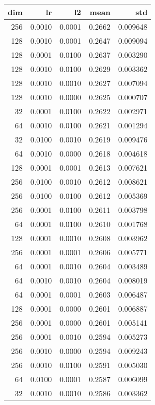 \begin{tabular}{rrrrr}
\toprule
 dim &      lr &      l2 &    mean &       std \\
\midrule
 256 &  0.0010 &  0.0001 &  0.2662 &  0.009648 \\
 128 &  0.0010 &  0.0001 &  0.2647 &  0.009094 \\
 128 &  0.0001 &  0.0100 &  0.2637 &  0.003290 \\
 128 &  0.0010 &  0.0100 &  0.2629 &  0.003362 \\
 128 &  0.0010 &  0.0010 &  0.2627 &  0.007094 \\
 128 &  0.0010 &  0.0000 &  0.2625 &  0.000707 \\
  32 &  0.0001 &  0.0100 &  0.2622 &  0.002971 \\
  64 &  0.0010 &  0.0100 &  0.2621 &  0.001294 \\
  32 &  0.0100 &  0.0010 &  0.2619 &  0.009476 \\
  64 &  0.0010 &  0.0000 &  0.2618 &  0.004618 \\
 128 &  0.0001 &  0.0001 &  0.2613 &  0.007621 \\
 256 &  0.0100 &  0.0010 &  0.2612 &  0.008621 \\
 256 &  0.0100 &  0.0100 &  0.2612 &  0.005369 \\
 256 &  0.0001 &  0.0100 &  0.2611 &  0.003798 \\
  64 &  0.0001 &  0.0100 &  0.2610 &  0.001768 \\
 128 &  0.0001 &  0.0010 &  0.2608 &  0.003962 \\
 256 &  0.0001 &  0.0001 &  0.2606 &  0.005771 \\
  64 &  0.0001 &  0.0010 &  0.2604 &  0.003489 \\
  64 &  0.0010 &  0.0010 &  0.2604 &  0.008019 \\
  64 &  0.0001 &  0.0001 &  0.2603 &  0.006487 \\
 128 &  0.0001 &  0.0000 &  0.2601 &  0.006887 \\
 256 &  0.0001 &  0.0000 &  0.2601 &  0.005141 \\
 256 &  0.0001 &  0.0010 &  0.2594 &  0.005273 \\
 256 &  0.0010 &  0.0000 &  0.2594 &  0.009243 \\
 256 &  0.0010 &  0.0100 &  0.2591 &  0.005030 \\
  64 &  0.0100 &  0.0001 &  0.2587 &  0.006099 \\
  32 &  0.0010 &  0.0010 &  0.2586 &  0.003362 \\

\end{tabular}
